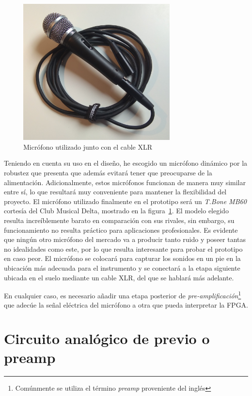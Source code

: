 \begin{figure}[!hb]
\begin{center}
\includegraphics[width=8cm]{img/microusado.jpg}
\caption{\label{fig:microusado}Micrófono utilizado junto con el cable XLR}
\end{center}
\end{figure}

Teniendo en cuenta su uso en el diseño, he escogido un micrófono dinámico por la robustez que presenta que además evitará tener que preocuparse de la alimentación. Adicionalmente, estos micrófonos funcionan de manera muy similar entre sí, lo que resultará muy conveniente para mantener la flexibilidad del proyecto. El micrófono utilizado  finalmente en el prototipo será un \emph{T.Bone MB60} \cite{tbonemic} cortesía del Club Musical Delta, mostrado en la figura~\ref{fig:microusado}. El modelo elegido resulta increíblemente barato en comparación con sus rivales, sin embargo, su funcionamiento no resulta práctico para aplicaciones profesionales. Es evidente que ningún otro micrófono del mercado va a producir tanto ruido y poseer tantas no idealidades como este, por lo que resulta interesante para probar el prototipo en caso peor. El micrófono se colocará para capturar los sonidos en un pie en la ubicación más adecuada para el instrumento y se conectará a la etapa siguiente ubicada en el suelo mediante un cable XLR, del que se hablará más adelante.

En cualquier caso, es necesario añadir una etapa posterior de \emph{pre-amplificación}\footnote{Comúnmente se utiliza el término \emph{preamp} proveniente del inglés} que adecúe la señal eléctrica del micrófono a otra que pueda interpretar la FPGA. 

\section{Circuito analógico de previo o preamp}

